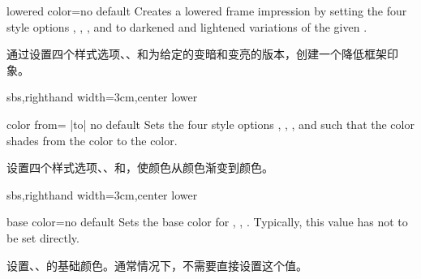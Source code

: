 \begin{vigTcbKey}[][doc new=2016-04-22]{lowered color}{=}{no default}
Creates a lowered frame impression by setting the four style options
,
,
, and
to darkened and lightened variations of the given .

通过设置四个样式选项、、和为给定的变暗和变亮的版本，创建一个降低框架印象。
\begin{dispExample*}{sbs,righthand width=3cm,center lower}
\end{dispExample*}
\end{vigTcbKey}


\begin{vigTcbKey}[][doc new=2016-04-22]{color from}{= |to| }{no default}
  Sets the four style options
  ,
  ,
  , and
  such that the color shades from the
   color to the  color.

设置四个样式选项、、和，使颜色从颜色渐变到颜色。
\begin{dispExample*}{sbs,righthand width=3cm,center lower}
\end{dispExample*}
\end{vigTcbKey}



\begin{vigTcbKey}[][doc new=2016-04-22]{base color}{=}{no default}
Sets the base color for ,
, .
Typically, this value has not to be set directly.

设置、、的基础颜色。通常情况下，不需要直接设置这个值。
\end{vigTcbKey}


